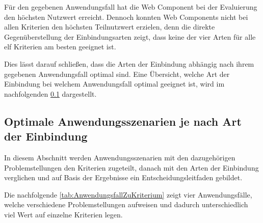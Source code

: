 Für den gegebenen Anwendungsfall hat die Web Component bei der Evaluierung den höchsten Nutzwert erreicht. Dennoch konnten Web Components nicht bei allen Kriterien den höchsten Teilnutzwert erzielen, denn die direkte Gegenüberstellung der Einbindungsarten zeigt, dass keine der vier Arten für alle elf Kriterien am besten geeignet ist. 

Dies lässt darauf schließen, dass die Arten der Einbindung abhängig nach ihrem gegebenen Anwendungsfall optimal sind. Eine Übersicht, welche Art der Einbindung bei welchem Anwendungsfall optimal geeignet ist, wird im nachfolgenden \cref{sec:OptimaleAnwendungsszenarien} dargestellt.

\subsection{Optimale Anwendungsszenarien je nach Art der Einbindung}\label{sec:OptimaleAnwendungsszenarien}

In diesem Abschnitt werden Anwendungsszenarien mit den dazugehörigen Problemstellungen den Kriterien zugeteilt, danach mit den Arten der Einbindung verglichen und auf Basis der Ergebnisse ein Entscheidungsleitfaden gebildet.

Die nachfolgende \cref{tab:AnwendungsfallZuKriterium} zeigt vier Anwendungsfälle, welche verschiedene Problemstellungen aufweisen und dadurch unterschiedlich viel Wert auf einzelne Kriterien legen.

